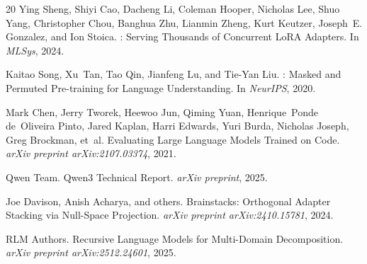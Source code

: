 \documentclass[11pt,a4paper]{article}
\begin{document}
\begin{thebibliography}{20}
Ying Sheng, Shiyi Cao, Dacheng Li, Coleman Hooper, Nicholas Lee, Shuo Yang, Christopher Chou, Banghua Zhu, Lianmin Zheng, Kurt Keutzer, Joseph~E. Gonzalez, and Ion Stoica.
: Serving Thousands of Concurrent {LoRA} Adapters.
\newblock In \emph{MLSys}, 2024.

Kaitao Song, Xu~Tan, Tao Qin, Jianfeng Lu, and Tie-Yan Liu.
: Masked and Permuted Pre-training for Language Understanding.
\newblock In \emph{NeurIPS}, 2020.

Mark Chen, Jerry Tworek, Heewoo Jun, Qiming Yuan, Henrique~Ponde de~Oliveira Pinto, Jared Kaplan, Harri Edwards, Yuri Burda, Nicholas Joseph, Greg Brockman, et~al.
\newblock Evaluating Large Language Models Trained on Code.
\newblock \emph{arXiv preprint arXiv:2107.03374}, 2021.

{Qwen Team}.
\newblock Qwen3 Technical Report.
\newblock \emph{arXiv preprint}, 2025.

{Joe Davison, Anish Acharya, and others}.
\newblock Brainstacks: Orthogonal Adapter Stacking via Null-Space Projection.
\newblock \emph{arXiv preprint arXiv:2410.15781}, 2024.

{RLM Authors}.
\newblock Recursive Language Models for Multi-Domain Decomposition.
\newblock \emph{arXiv preprint arXiv:2512.24601}, 2025.

\end{thebibliography}
\end{document}
